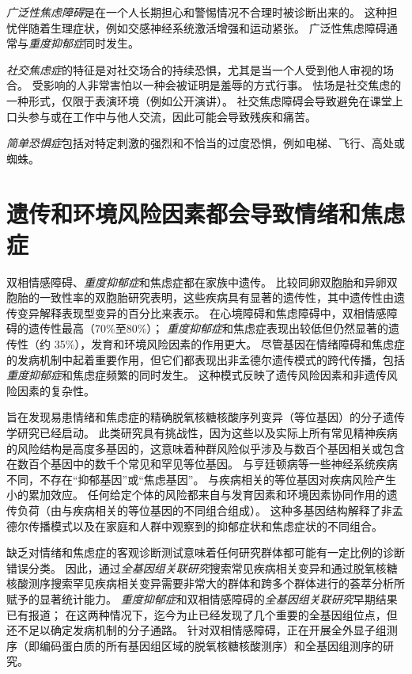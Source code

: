 \textit{广泛性焦虑障碍}是在一个人长期担心和警惕情况不合理时被诊断出来的。
这种担忧伴随着生理症状，例如交感神经系统激活增强和运动紧张。
广泛性焦虑障碍通常与\textit{重度抑郁症}同时发生。


\textit{社交焦虑症}的特征是对社交场合的持续恐惧，尤其是当一个人受到他人审视的场合。
受影响的人非常害怕以一种会被证明是羞辱的方式行事。
怯场是社交焦虑的一种形式，仅限于表演环境（例如公开演讲）。
社交焦虑障碍会导致避免在课堂上口头参与或在工作中与他人交流，因此可能会导致残疾和痛苦。



\textit{简单恐惧症}包括对特定刺激的强烈和不恰当的过度恐惧，例如电梯、飞行、高处或蜘蛛。



\section{遗传和环境风险因素都会导致情绪和焦虑症}

双相情感障碍、\textit{重度抑郁症}和焦虑症都在家族中遗传。
比较同卵双胞胎和异卵双胞胎的一致性率的双胞胎研究表明，这些疾病具有显著的遗传性，其中遗传性由遗传变异解释表现型变异的百分比来表示。
在心境障碍和焦虑障碍中，双相情感障碍的遗传性最高（70\%至80\%）；
\textit{重度抑郁症}和焦虑症表现出较低但仍然显著的遗传性（约 35\%），发育和环境风险因素的作用更大。
尽管基因在情绪障碍和焦虑症的发病机制中起着重要作用，但它们都表现出非孟德尔遗传模式的跨代传播，包括\textit{重度抑郁症}和焦虑症频繁的同时发生。
这种模式反映了遗传风险因素和非遗传风险因素的复杂性。


旨在发现易患情绪和焦虑症的精确脱氧核糖核酸序列变异（等位基因）的分子遗传学研究已经启动。
此类研究具有挑战性，因为这些以及实际上所有常见精神疾病的风险结构是高度多基因的，这意味着种群风险似乎涉及与数百个基因相关或包含在数百个基因中的数千个常见和罕见等位基因。
与亨廷顿病等一些神经系统疾病不同，不存在“抑郁基因”或“焦虑基因”。
与疾病相关的等位基因对疾病风险产生小的累加效应。
任何给定个体的风险都来自与发育因素和环境因素协同作用的遗传负荷（由与疾病相关的等位基因的不同组合组成）。
这种多基因结构解释了非孟德尔传播模式以及在家庭和人群中观察到的抑郁症状和焦虑症状的不同组合。


缺乏对情绪和焦虑症的客观诊断测试意味着任何研究群体都可能有一定比例的诊断错误分类。
因此，通过\textit{全基因组关联研究}搜索常见疾病相关变异和通过脱氧核糖核酸测序搜索罕见疾病相关变异需要非常大的群体和跨多个群体进行的荟萃分析所赋予的显著统计能力。
\textit{重度抑郁症}和双相情感障碍的\textit{全基因组关联研究}早期结果已有报道；
在这两种情况下，迄今为止已经发现了几个重要的全基因组位点，但还不足以确定发病机制的分子通路。
针对双相情感障碍，正在开展全外显子组测序（即编码蛋白质的所有基因组区域的脱氧核糖核酸测序）和全基因组测序的研究。


